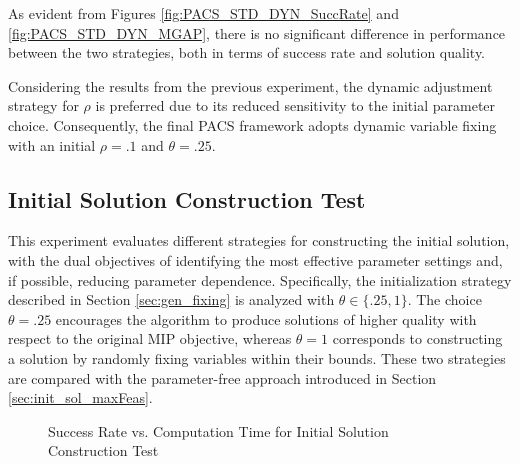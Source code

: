 As evident from Figures \ref{fig:PACS_STD_DYN_SuccRate} and \ref{fig:PACS_STD_DYN_MGAP}, there is no significant difference in performance between the two strategies, both in terms of success rate and solution quality.

Considering the results from the previous experiment, the dynamic adjustment strategy for $\rho$ is preferred due to its reduced sensitivity to the initial parameter choice. Consequently, the final PACS framework adopts dynamic variable fixing with an initial $\rho = .1$ and $\theta = .25$.

\subsection{Initial Solution Construction Test}\label{sec:test_init_sol}
This experiment evaluates different strategies for constructing the initial solution, with the dual objectives of identifying the most effective parameter settings and, if possible, reducing parameter dependence. Specifically, the initialization strategy described in Section \ref{sec:gen_fixing} is analyzed with $\theta \in \{.25, 1\}$. The choice $\theta = .25$ encourages the algorithm to produce solutions of higher quality with respect to the original MIP objective, whereas $\theta = 1$ corresponds to constructing a solution by randomly fixing variables within their bounds. These two strategies are compared with the parameter-free approach introduced in Section \ref{sec:init_sol_maxFeas}.  
\begin{figure}[H]
    \centering
    \begin{minipage}{0.6\columnwidth}
        \centering
        \resizebox{\linewidth}{!}{}
    \end{minipage}%
    \hfill
    \begin{minipage}{0.4\columnwidth} 
        \centering
        \resizebox{\linewidth}{!}{}
    \end{minipage}
    \caption{Success Rate vs. Computation Time for Initial Solution Construction Test}
    \label{fig:PACS_InitSol_SuccRate}
\end{figure}

